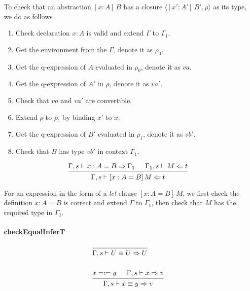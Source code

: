 \documentclass{article}
\theoremstyle{remark}
\begin{document}
To check that an abstraction $[x : A] \, B$ has a closure $\langle [x' : A'] \, B', \rho \rangle$ as its type, we do as follows
\begin{enumerate}
\item Check declaration $x : A$ is valid and extend $\Gamma$ to $\Gamma_1$.
\item Get the environment from the $\Gamma$, denote it as $\rho_0$.
\item Get the q-expression of $A$ evaluated in $\rho_0$, denote it as $va$.
\item Get the q-expression of $A'$ in $\rho$, denote it as $va'$.
\item Check that $va$ and $va'$ are convertible.
\item Extend $\rho$ to $\rho_1$ by binding $x'$ to $x$.
\item Get the q-expression of $B'$ evaluated in $\rho_1$, denote it as $vb'$.
\item Check that $B$ has type $vb'$ in context $\Gamma_1$.
\end{enumerate}

\begin{align}
  \begin{prooftree}
    \hypo{\Gamma,s \vdash x : A = B \Rightarrow \Gamma_1}
    \hypo{\Gamma_1,s \vdash M \Leftarrow t}
    \infer2{\Gamma,s \vdash [x : A = B]\,M \Leftarrow t}
  \end{prooftree}
\end{align}

For an expression in the form of a \emph{let} clause $[x : A = B] \, M$, we first check the definition $x : A = B$ is correct and extend $\Gamma$ to $\Gamma_1$, then check that $M$ has the required type in $\Gamma_1$.

\paragraph{checkEqualInferT}
\begin{align}
  &\begin{prooftree}
    \infer0{\Gamma,s \vdash U \equiv U \Rightarrow U} 
  \end{prooftree} \\
  \nonumber \\
  &\begin{prooftree}
    \hypo{x =:= y}
    \hypo{\Gamma,s \vdash x \Rightarrow v}
    \infer2{\Gamma,s \vdash x \equiv y \Rightarrow v} 
  \end{prooftree}
\end{align}
\end{document}
